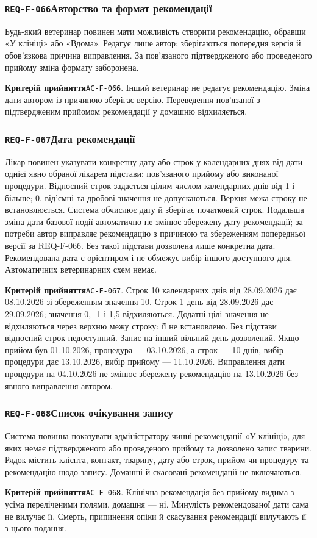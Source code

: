 \documentclass[11pt,a4paper]{article}
\newcommand{\requirement}[4]{%
  \Needspace{7\baselineskip}%
  \subsubsection*{\hypertarget{#1}{\texttt{#1}}\quad #2}%
  #3\par
  \textbf{Критерій прийняття}\quad #4\par\medskip}
\begin{document}
\requirement{REQ-F-066}{Авторство та формат рекомендації}{Будь-який ветеринар повинен мати можливість створити рекомендацію, обравши «У клініці» або «Вдома». Редагує лише автор; зберігаються попередня версія й обов’язкова причина виправлення. За пов’язаного підтвердженого або проведеного прийому зміна формату заборонена.}{\hypertarget{AC-F-066}{\texttt{AC-F-066}}. Інший ветеринар не редагує рекомендацію. Зміна дати автором із причиною зберігає версію. Переведення пов’язаної з підтвердженим прийомом рекомендації у домашню відхиляється.}

\requirement{REQ-F-067}{Дата рекомендації}{Лікар повинен указувати конкретну дату або строк у календарних днях від дати однієї явно обраної лікарем підстави: пов’язаного прийому або виконаної процедури. Відносний строк задається цілим числом календарних днів від 1 і більше; 0, від’ємні та дробові значення не допускаються. Верхня межа строку не встановлюється. Система обчислює дату й зберігає початковий строк. Подальша зміна дати базової події автоматично не змінює збережену дату рекомендації; за потреби автор виправляє рекомендацію з причиною та збереженням попередньої версії за REQ-F-066. Без такої підстави дозволена лише конкретна дата. Рекомендована дата є орієнтиром і не обмежує вибір іншого доступного дня. Автоматичних ветеринарних схем немає.}{\hypertarget{AC-F-067}{\texttt{AC-F-067}}. Строк 10 календарних днів від 28.09.2026 дає 08.10.2026 зі збереженням значення 10. Строк 1 день від 28.09.2026 дає 29.09.2026; значення 0, -1 і 1,5 відхиляються. Додатні цілі значення не відхиляються через верхню межу строку: її не встановлено. Без підстави відносний строк недоступний. Запис на інший вільний день дозволений. Якщо прийом був 01.10.2026, процедура — 03.10.2026, а строк — 10 днів, вибір процедури дає 13.10.2026, вибір прийому — 11.10.2026. Виправлення дати процедури на 04.10.2026 не змінює збережену рекомендацію на 13.10.2026 без явного виправлення автором.}

\requirement{REQ-F-068}{Список очікування запису}{Система повинна показувати адміністратору чинні рекомендації «У клініці», для яких немає підтвердженого або проведеного прийому та дозволено запис тварини. Рядок містить клієнта, контакт, тварину, дату або строк, прийом чи процедуру та рекомендацію щодо запису. Домашні й скасовані рекомендації не включаються.}{\hypertarget{AC-F-068}{\texttt{AC-F-068}}. Клінічна рекомендація без прийому видима з усіма переліченими полями, домашня — ні. Минулість рекомендованої дати сама не вилучає її. Смерть, припинення опіки й скасування рекомендації вилучають її з цього подання.}
\end{document}
